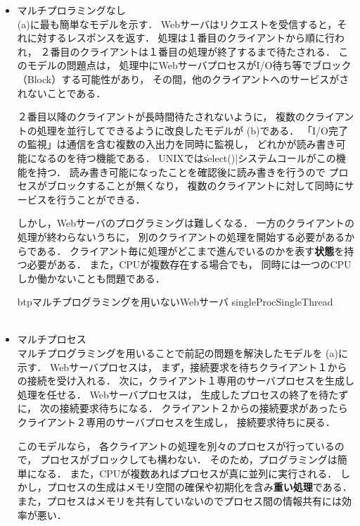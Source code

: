 \begin{itemize}
\item マルチプロラミングなし \\
(a)に最も簡単なモデルを示す．
Webサーバはリクエストを受信すると，それに対するレスポンスを返す．
処理は１番目のクライアントから順に行われ，
２番目のクライアントは１番目の処理が終了するまで待たされる．
このモデルの問題点は，
処理中にWebサーバプロセスがI/O待ち等でブロック（Block）する可能性があり，
その間，他のクライアントへのサービスがされないことである．

２番目以降のクライアントが長時間待たされないように，
複数のクライアントの処理を並行してできるように改良したモデルが
(b)である．
「I/O完了の監視」は通信を含む複数の入出力を同時に監視し，
どれかが読み書き可能になるのを待つ機能である．
UNIXでは\|select()|システムコールがこの機能を持つ．
読み書き可能になったことを確認後に読み書きを行うので
プロセスがブロックすることが無くなり，
複数のクライアントに対して同時にサービスを行うことができる．

しかし，Webサーバのプログラミングは難しくなる．
一方のクライアントの処理が終わらないうちに，
別のクライアントの処理を開始する必要があるからである．
クライアント毎に処理がどこまで進んでいるのかを表す{\bf 状態}を持つ必要がある．
また，CPUが複数存在する場合でも，
同時には一つのCPUしか働かないことも問題である．

\begin{myfig}{btp}{マルチプログラミングを用いないWebサーバ}
{singleProcSingleThread}
~~~~
\end{myfig}

\item マルチプロセス \\
マルチプログラミングを用いることで前記の問題を解決したモデルを
(a)に示す．
Webサーバプロセスは，
まず，接続要求を待ちクライアント１からの接続を受け入れる．
次に，クライアント１専用のサーバプロセスを生成し処理を任せる．
Webサーバプロセスは，
生成したプロセスの終了を待たずに，
次の接続要求待ちになる．
クライアント２からの接続要求があったら
クライアント２専用のサーバプロセスを生成し，
接続要求待ちに戻る．

このモデルなら，
各クライアントの処理を別々のプロセスが行っているので，
プロセスがブロックしても構わない．
そのため，プログラミングは簡単になる．
また，CPUが複数あればプロセスが真に並列に実行される．
しかし，プロセスの生成はメモリ空間の確保や初期化を含み{\bf 重い処理}である．
また，プロセスはメモリを共有していないのでプロセス間の情報共有には効率が悪い．


\end{itemize}
